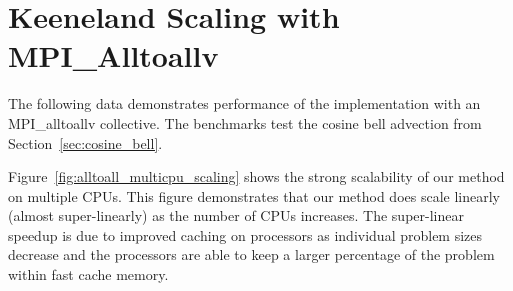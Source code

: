 \section{Keeneland Scaling with MPI\_Alltoallv}

The following data demonstrates performance of the implementation with an MPI\_alltoallv collective. The benchmarks test the cosine bell advection from Section~\ref{sec:cosine_bell}. 

Figure~\ref{fig:alltoall_multicpu_scaling} shows the strong scalability of our method on multiple CPUs. This figure demonstrates that our method does scale linearly (almost super-linearly) as the number of CPUs increases. 
The super-linear speedup is due to improved caching on processors as individual problem sizes decrease and the processors are able to keep a larger percentage of the problem within fast cache memory.


